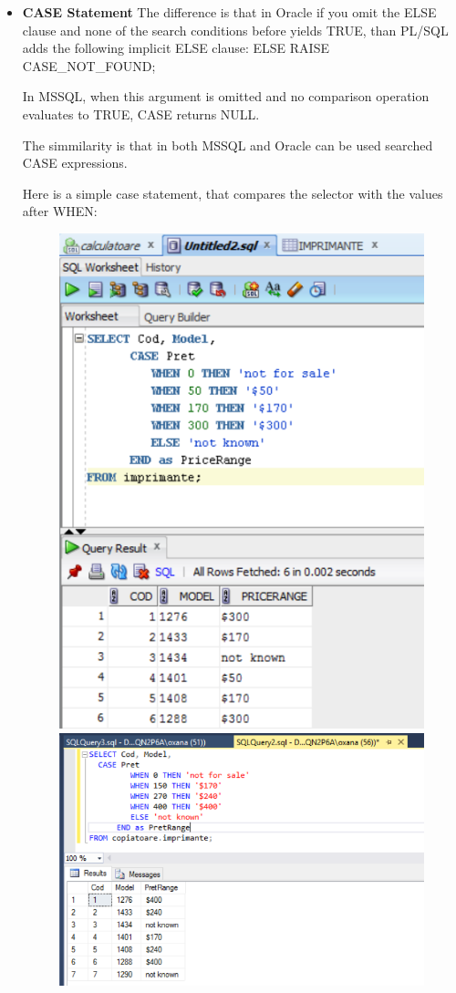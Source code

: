 \begin{itemize}
  \item \textbf{CASE Statement}\newline
The difference is that in Oracle if you omit the ELSE clause and none of the search conditions before yields TRUE, than PL/SQL adds the following implicit ELSE clause:
ELSE RAISE CASE\_NOT\_FOUND;

In MSSQL, when this argument is omitted and no comparison operation evaluates to TRUE, CASE returns NULL.

The simmilarity is that in both MSSQL and Oracle can be used searched CASE expressions.

Here is a simple case statement, that compares the selector with the values after WHEN:

\begin{figure}[ht!]
    \centering
    \includegraphics[scale=0.7]{images/example3-case.png}
	\includegraphics[scale=0.8]{images/example3a-case.png}

\end{figure}
\end{itemize}
